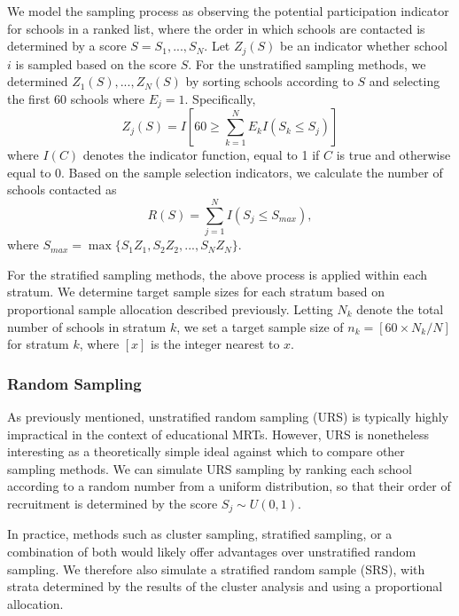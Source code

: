 \documentclass[man,floatsintext]{apa6}
\begin{document}
We model the sampling process as observing the potential participation indicator for schools in a ranked list, where the order in which schools are contacted is determined by a score \(S = S_1,...,S_N\). Let \(Z_j(S)\) be an indicator whether school \(i\) is sampled based on the score \(S\).
For the unstratified sampling methods, we determined \(Z_1(S),...,Z_N(S)\) by sorting schools according to \(S\) and selecting the first 60 schools where \(E_j = 1\).
Specifically,
\begin{equation}
\label{eq:Zj}
Z_j(S) = I\left[60 \geq \sum_{k=1}^N E_k I\left(S_k \leq S_j\right)\right]
\end{equation}
where \(I(C)\) denotes the indicator function, equal to 1 if \(C\) is true and otherwise equal to 0. Based on the sample selection indicators, we calculate the number of schools contacted as
\begin{equation}
\label{eq:R}
R(S) = \sum_{j=1}^N I(S_j \leq S_{max}),
\end{equation}
where \(S_{max} = \max \{S_1 Z_1, S_2 Z_2, ..., S_N Z_N\}\).

For the stratified sampling methods, the above process is applied within each stratum. We determine target sample sizes for each stratum based on proportional sample allocation described previously. Letting \(N_k\) denote the total number of schools in stratum \(k\), we set a target sample size of \(n_k = [60 \times N_k / N]\) for stratum \(k\), where \([x]\) is the integer nearest to \(x\).

\hypertarget{random-sampling}{%
\subsubsection{Random Sampling}\label{random-sampling}}

As previously mentioned, unstratified random sampling (URS) is typically highly impractical in the context of educational MRTs. However, URS is nonetheless interesting as a theoretically simple ideal against which to compare other sampling methods. We can simulate URS sampling by ranking each school according to a random number from a uniform distribution, so that their order of recruitment is determined by the score \(S_j \sim U(0, 1)\).

In practice, methods such as cluster sampling, stratified sampling, or a combination of both would likely offer advantages over unstratified random sampling. We therefore also simulate a stratified random sample (SRS), with strata determined by the results of the cluster analysis and using a proportional allocation.
\end{document}
